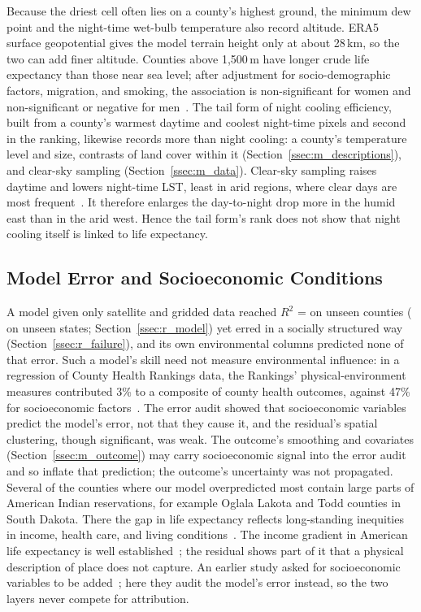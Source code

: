 \documentclass[sensors,article,submit,moreauthors,pdftex]{Definitions/mdpi}
\begin{document}
Because
the driest cell often lies on a county's highest
ground, the minimum dew point and the night-time wet-bulb temperature also record
altitude. ERA5 surface geopotential gives the model terrain height only at
about 28\,km, so the two can add finer altitude. Counties above 1,500\,m have longer crude life expectancy than those
near sea level; after adjustment for socio-demographic factors, migration, and
smoking, the association is non-significant for women and non-significant or
negative for men~\cite{Ezzati2011}.
The tail form of night cooling efficiency, built from a county's warmest daytime and coolest night-time pixels and second in the ranking, likewise records more than
night cooling: a county's temperature level and size, contrasts of land cover
within it (Section~\ref{ssec:m_descriptions}), and clear-sky sampling
(Section~\ref{ssec:m_data}). Clear-sky
sampling raises daytime and lowers night-time LST, least in arid regions,
where clear days are most frequent~\cite{Ermida2019}. It therefore enlarges
the day-to-night drop more in the humid east than in the arid west. Hence the tail form's rank does not show that night
cooling itself is linked to life expectancy.

\subsection{Model Error and Socioeconomic Conditions}
\label{ssec:d_failure}
A model given only satellite and gridded data reached $R^{2}$ = \Rtwo{} on
unseen counties (\HoldStateRtwo{} on unseen states;
Section~\ref{ssec:r_model}) yet erred in a socially structured
way (Section~\ref{ssec:r_failure}), and its own environmental columns
predicted none of that error. Such a model's
skill
need not measure environmental influence: in a regression of County Health
Rankings data, the Rankings' physical-environment measures contributed 3\% to
a composite of county health outcomes, against 47\% for socioeconomic
factors~\cite{Hood2016}. The error audit showed that socioeconomic variables predict the model's
error, not that they cause it, and the residual's spatial clustering, though
significant, was weak. The outcome's smoothing and covariates
(Section~\ref{ssec:m_outcome}) may carry socioeconomic signal into the error
audit and so inflate that prediction; the outcome's uncertainty was not
propagated. Several of the
counties where our model overpredicted most contain large parts of American Indian
reservations, for example Oglala Lakota and Todd counties in South Dakota.
There the gap in life expectancy reflects long-standing inequities in income,
health care, and living conditions~\cite{Jones2006}. The income gradient in American life
expectancy is well established~\cite{Chetty2016, DwyerLindgren2017}; the
residual shows part of it that a physical description of place does not capture.
An earlier study asked for
socioeconomic variables to be added~\cite{Ruwali2026multi}; here they audit the
model's error instead, so the two layers never compete for attribution.
\end{document}
